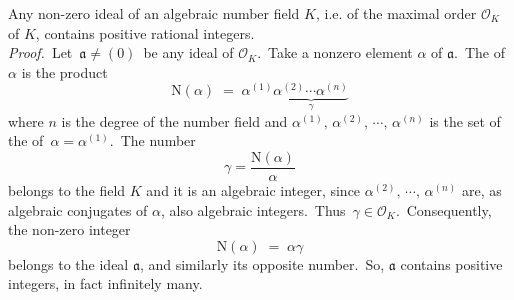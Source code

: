 \documentclass[12pt]{article}
\theoremstyle{definition}
\begin{document}
Any non-zero ideal of an algebraic number field $K$, i.e. of the maximal order $\mathcal{O}_K$ of $K$, contains positive rational integers.\\

\emph{Proof.}\, Let\, $\mathfrak{a} \neq (0)$\, be any ideal of $\mathcal{O}_K$.\, Take a nonzero element $\alpha$ of 
$\mathfrak{a}$.\, The  of $\alpha$ is the product
$$\mbox{N}(\alpha) \;=\; \alpha^{(1)}\underbrace{\alpha^{(2)}\cdots\alpha^{(n)}}_{\gamma}$$
where $n$ is the degree of the number field and $\alpha^{(1)},\,\alpha^{(2)},\,\cdots,\,\alpha^{(n)}$ is the  set of the  of\, $\alpha = \alpha^{(1)}$.\, The number
$$\gamma = \frac{\mbox{N}(\alpha)}{\alpha}$$
belongs to the field $K$ and it is an algebraic integer, since $\alpha^{(2)},\,\cdots,\,\alpha^{(n)}$ are, as algebraic conjugates of $\alpha$, also algebraic integers.\, Thus\, $\gamma \in \mathcal{O}_K$.\, Consequently, the non-zero integer
$$\mbox{N}(\alpha) \;=\; \alpha\gamma$$
belongs to the ideal $\mathfrak{a}$, and similarly its opposite number.\, So, $\mathfrak{a}$ contains positive integers, in fact infinitely many.

\end{document}

